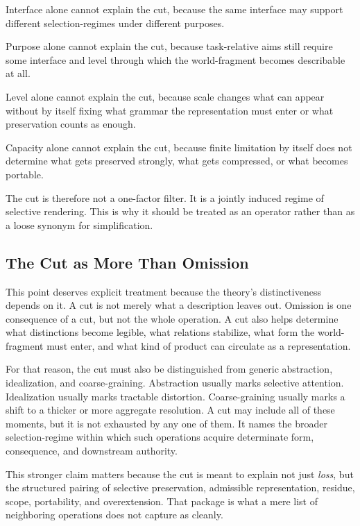 \documentclass[11pt]{article}
\renewcommand{\emph}[1]{\textit{#1}}
\begin{document}
Interface alone cannot explain the cut, because the same interface may support different selection-regimes under different purposes.

Purpose alone cannot explain the cut, because task-relative aims still require some interface and level through which the world-fragment becomes describable at all.

Level alone cannot explain the cut, because scale changes what can appear without by itself fixing what grammar the representation must enter or what preservation counts as enough.

Capacity alone cannot explain the cut, because finite limitation by itself does not determine what gets preserved strongly, what gets compressed, or what becomes portable.

The cut is therefore not a one-factor filter. It is a jointly induced regime of selective rendering. This is why it should be treated as an operator rather than as a loose synonym for simplification.

\subsection{The Cut as More Than Omission}

This point deserves explicit treatment because the theory's distinctiveness depends on it. A cut is not merely what a description leaves out. Omission is one consequence of a cut, but not the whole operation. A cut also helps determine what distinctions become legible, what relations stabilize, what form the world-fragment must enter, and what kind of product can circulate as a representation.

For that reason, the cut must also be distinguished from generic abstraction, idealization, and coarse-graining. Abstraction usually marks selective attention. Idealization usually marks tractable distortion. Coarse-graining usually marks a shift to a thicker or more aggregate resolution. A cut may include all of these moments, but it is not exhausted by any one of them. It names the broader selection-regime within which such operations acquire determinate form, consequence, and downstream authority.

This stronger claim matters because the cut is meant to explain not just \emph{loss}, but the structured pairing of selective preservation, admissible representation, residue, scope, portability, and overextension. That package is what a mere list of neighboring operations does not capture as cleanly.
\end{document}

